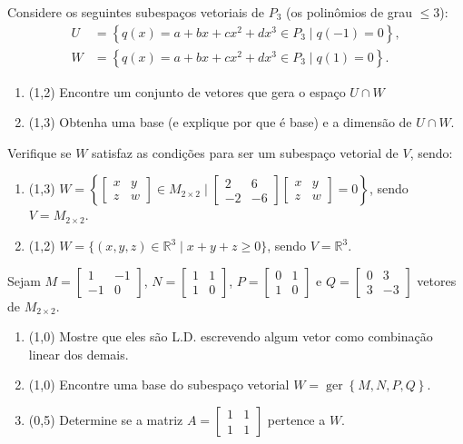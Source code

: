 \documentclass[12pt,a4paper]{article}
\newcommand{\fixme}{{\color{red}(...)}}
\newcommand*\ger[1]{\operatorname{ger}\left\{#1\right\}}
\newcommand*\R{\mathbb{R}}
\begin{document}
\begin{ExerciseList}
\Exercise[title={2,5}] Considere os seguintes subespaços vetoriais de $P_3$ (os polinômios de grau $\leq 3$):
\begin{align*}
U &= \left\{ q(x) = a + bx + cx^2 + dx^3 \in P_3 \mid q(-1) = 0 \right\},\\
W &= \left\{ q(x) = a + bx + cx^2 + dx^3 \in P_3 \mid q( 1) = 0 \right\}.
\end{align*}
\begin{enumerate}
\item (1,2) Encontre um conjunto de vetores que gera o espaço $U \cap W$
\item (1,3) Obtenha uma base (e explique por que é base) e a dimensão de $U \cap W$.
\end{enumerate}
\Answer  \fixme


\Exercise[title={2,5}]
Verifique se $W$ satisfaz as condições para ser um subespaço vetorial de $V$, sendo:
\begin{enumerate}
\item (1,3) $W = \left\{ \begin{bmatrix}
x & y \\
z & w
\end{bmatrix} \in M_{2\times 2} \mid \begin{bmatrix}
2 & 6 \\
-2 & -6
\end{bmatrix} \begin{bmatrix}
x & y \\
z & w
\end{bmatrix} = 0 \right\}$, sendo $V = M_{2 \times 2}$.


\item (1,2) $W = \{ (x,y,z) \in \R^3 \mid x + y + z \geq 0 \}$, sendo $V = \R^3$.
\end{enumerate}
\Answer \fixme


\Exercise[title={2,5}]
Sejam $M= \begin{bmatrix}
1 & -1 \\ -1 & 0
\end{bmatrix}$, $N= \begin{bmatrix}
1 & 1 \\ 1 & 0
\end{bmatrix}$, $P= \begin{bmatrix}
0 & 1 \\ 1 & 0
\end{bmatrix}$ e $Q= \begin{bmatrix}
0 & 3 \\ 3 & -3
\end{bmatrix}$ vetores de $M_{2 \times 2}$.
\begin{enumerate}
\item (1,0) Mostre que eles são L.D. escrevendo algum vetor como combinação linear dos demais.
\item (1,0) Encontre uma base do subespaço vetorial $W = \ger{ M, N, P, Q }$.
\item (0,5) Determine se a matriz $A = \begin{bmatrix}
1 & 1 \\ 1 & 1
\end{bmatrix}$ pertence a $W$.
\end{enumerate}
\Answer  \fixme



\end{ExerciseList}
\end{document}
